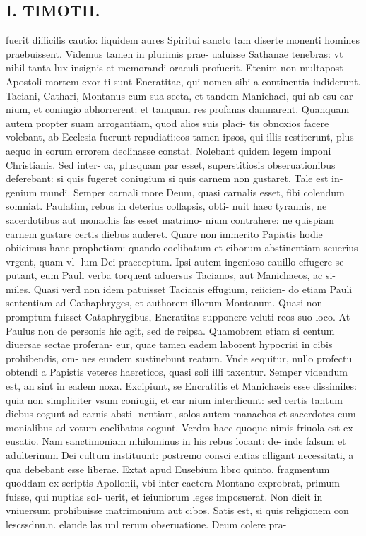 \documentclass{article}
\begin{document}
\begin{pages}
\section*{I. TIMOTH. }
\marginpar{[ p.46 ]}\pstart fuerit difficilis cautio: fiquidem aures Spiritui sancto tam diserte monenti homines praebuissent. Videmus tamen in plurimis prae- ualuisse Sathanae tenebras: vt nihil tanta lux insignis et memorandi oraculi profuerit. Etenim non multapost Apostoli mortem exor ti sunt Encratitae, qui nomen sibi a continentia indiderunt. Taciani, Cathari, Montanus cum sua secta, et tandem Manichaei, qui ab esu car nium, et coniugio abhorrerent: et tanquam res profanas damnarent. Quanquam autem propter suam arrogantiam, quod alios suis placi- tis obnoxios facere volebant, ab Ecclesia fuerunt repudiati:eos tamen ipsos, qui illis restiterunt, plus aequo in eorum errorem declinasse constat. Nolebant quidem legem imponi Christianis. Sed inter- ca, plusquam par esset, superstitiosis obseruationibus deferebant: si quis fugeret coniugium si quis carnem non gustaret. Tale est in- genium mundi. Semper carnali more Deum, quasi carnalis esset, fibi colendum somniat. Paulatim, rebus in deterius collapsis, obti- nuit haec tyrannis, ne sacerdotibus aut monachis fas esset matrimo- nium contrahere: ne quispiam carnem gustare certis diebus auderet. Quare non immerito Papistis hodie obiicimus hanc prophetiam: quando coelibatum et ciborum abstinentiam seuerius vrgent, quam vl- lum Dei praeceptum. Ipsi autem ingenioso cauillo effugere se putant, eum Pauli verba torquent aduersus Tacianos, aut Manichaeos, ac si- miles. Quasi verd̀ non idem patuisset Tacianis effugium, reiicien- do etiam Pauli sententiam ad Cathaphryges, et authorem illorum Montanum. Quasi non promptum fuisset Cataphrygibus, Encratitas supponere veluti reos suo loco. At Paulus non de personis hic agit, sed de reipsa. Quamobrem etiam si centum diuersae sectae proferan- eur, quae tamen eadem laborent hypocrisi in cibis prohibendis, om- nes eundem sustinebunt reatum. Vnde sequitur, nullo profectu obtendi a Papistis veteres haereticos, quasi soli illi taxentur. Semper videndum est, an sint in eadem noxa. Excipiunt, se Encratitis et Manichaeis esse dissimiles: quia non simpliciter vsum coniugii, et car nium interdicunt: sed certis tantum diebus cogunt ad carnis absti- nentiam, solos autem manachos et sacerdotes cum monialibus ad votum coelibatus cogunt. Verdm haec quoque nimis friuola est ex- eusatio. Nam sanctimoniam nihilominus in his rebus locant: de- inde falsum et adulterinum Dei cultum instituunt: postremo consci entias alligant necessitati, a qua debebant esse liberae. Extat apud Eusebium libro quinto, fragmentum quoddam ex scriptis Apollonii, vbi inter caetera Montano exprobrat, primum fuisse, qui nuptias sol- uerit, et ieiuniorum leges imposuerat. Non dicit in vniuersum prohibuisse matrimonium aut cibos. Satis est, si quis religionem con lescssdnu.n. elande las unl rerum obseruatione. Deum colere pra-  \pend

\end{pages}
\end{document}
